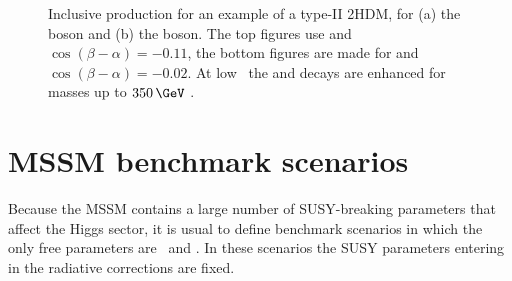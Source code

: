 \begin{figure}[h!]
\begin{center}
\end{center}
\caption[Inclusive production \xsbr for an example of a type-II 2HDM, for the \PHiggs and \PHiggsps boson.]{Inclusive production \xsbr for an example
of a type-II \ac{2HDM}, for (a) the \PHiggs boson and (b) the \PHiggsps boson. The
top figures use  and $\cos{(\beta-\alpha)}=-0.11$, the bottom
figures are made for  and $\cos{(\beta-\alpha)}=-0.02$. At low \tanb~the \Htohh and
\AtoZh decays are enhanced for masses up to $350\,\GeV$ \cite{2HDM-II}.}
\label{fig:2hdm_Hxsbr}
\end{figure}


\section{MSSM benchmark scenarios}
\label{sec:theory_BSM_models}
Because the MSSM contains a large number of
SUSY-breaking parameters that affect the Higgs
sector, it is usual to define benchmark scenarios 
in which the only free parameters are \mA~and \tanb.
In these scenarios the SUSY parameters entering in 
the radiative corrections are fixed.

